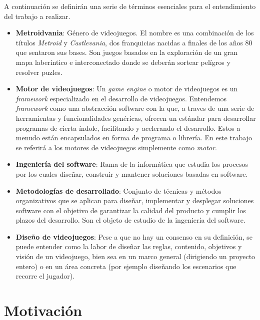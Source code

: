 A continuación se definirán una serie de términos esenciales para el entendimiento del trabajo a realizar.

\begin{itemize}
    \item \textbf{Metroidvania}: Género de videojuegos. El nombre es una combinación de los títulos \textit{Metroid} y \textit{Castlevania}, dos franquicias nacidas a finales de los años 80 que sentaron sus bases. Son juegos basados en la exploración de un gran mapa laberíntico e interconectado donde se deberán sortear pelígros y resolver puzles.

    \item \textbf{Motor de videojuegos}: Un \textit{game engine} o motor de videojuegos es un \textit{framework} especializado en el desarrollo de videojuegos. Entendemos \textit{framework} como una abstracción software con la que, a traves de una serie de herramientas y funcionalidades genéricas, ofrecen un estándar para desarrollar programas de cierta índole, facilitando y acelerando el desarrollo. Estos a menudo están encapsulados en forma de programa o librería. En este trabajo se referirá a los motores de videojuegos simplemente como \textit{motor}.
    
    \item \textbf{Ingeniería del software}: Rama de la informática que estudia los procesos por los cuales diseñar, construir y mantener soluciones basadas en software.

    \item \textbf{Metodologías de desarrollado}: Conjunto de técnicas y métodos organizativos que se aplican para diseñar, implementar y desplegar soluciones software con el objetivo de garantizar la calidad del producto y cumplir los plazos del desarrollo. Son el objeto de estudio de la ingeniería del software.
    
    \item \textbf{Diseño de videojuegos}: Pese a que no hay un consenso en su definición, se puede entender como la labor de diseñar las reglas, contenido, objetivos y visión de un videojuego, bien sea en un marco general (dirigiendo un proyecto entero) o en un área concreta (por ejemplo diseñando los escenarios que recorre el jugador).

\end{itemize} 

\section{Motivación}

